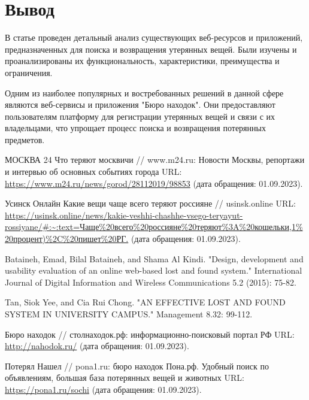 \documentclass{../mirea}
\begin{document}
	\section{Вывод}
	
	В статье проведен детальный анализ существующих веб-ресурсов и приложений, предназначенных для поиска и возвращения утерянных вещей. Были изучены и проанализированы их функциональность, характеристики, преимущества и ограничения.
	
	Одним из наиболее популярных и востребованных решений в данной сфере являются веб-сервисы и приложения "Бюро находок". Они предоставляют пользователям платформу для регистрации утерянных вещей и связи с их владельцами, что упрощает процесс поиска и возвращения потерянных предметов.
	
	
	
	
	\begin{thebibliography}{99\kern\bibindent}
		 МОСКВА 24 Что теряют москвичи // www.m24.ru: Новости Москвы, репортажи и интервью об основных событиях города URL: \url{https://www.m24.ru/news/gorod/28112019/98853} (дата обращения: 01.09.2023).
		
		 Усинск Онлайн Какие вещи чаще всего теряют россияне // usinsk.online URL: \url{https://usinsk.online/news/kakie-veshhi-chashhe-vsego-teryayut-rossiyane/#:~:text=Чаще%20всего%20россияне%20теряют%3A%20кошельки,1%20процент)%2C%20пишет%20РГ.} (дата обращения: 01.09.2023).
		
		 Bataineh, Emad, Bilal Bataineh, and Shama Al Kindi. "Design, development and usability evaluation of an online web-based lost and found system." International Journal of Digital Information and Wireless Communications 5.2 (2015): 75-82. %
		
		 Tan, Siok Yee, and Cia Rui Chong. "AN EFFECTIVE LOST AND FOUND SYSTEM IN UNIVERSITY CAMPUS." Management 8.32: 99-112. %
		
		
		 Бюро находок // столнаходок.рф: информационно-поисковый портал РФ URL: \url{http://nahodok.ru/} (дата обращения: 01.09.2023).
		
		 Потерял Нашел // pona1.ru: бюро находок Пона.рф. Удобный поиск по объявлениям, большая база потерянных вещей и животных URL: \url{https://pona1.ru/sochi} (дата обращения: 01.09.2023).
		

\end{thebibliography}
\end{document}
